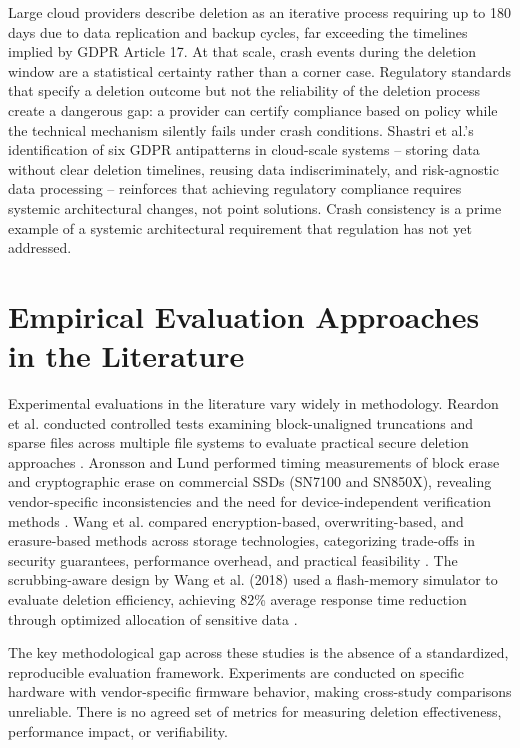 Large cloud providers describe deletion as an iterative process requiring up to 180 days due to 
data replication and backup cycles, far exceeding the timelines implied by GDPR Article 17. At 
that scale, crash events during the deletion window are a statistical certainty rather than a 
corner case. Regulatory standards that specify a deletion outcome but not the reliability of the 
deletion process create a dangerous gap: a provider can certify compliance based on policy while 
the technical mechanism silently fails under crash conditions. Shastri et al.'s identification of 
six GDPR antipatterns in cloud-scale systems -- storing data without clear deletion timelines, 
reusing data indiscriminately, and risk-agnostic data processing -- reinforces that achieving 
regulatory compliance requires systemic architectural changes, not point solutions. Crash 
consistency is a prime example of a systemic architectural requirement that regulation has not yet 
addressed.

\section{Empirical Evaluation Approaches in the Literature}
Experimental evaluations in the literature vary widely in methodology. Reardon et al. conducted 
controlled tests examining block-unaligned truncations and sparse files across multiple file 
systems to evaluate practical secure deletion approaches \cite{reardon2013sok}. Aronsson and Lund 
performed timing measurements of block erase and cryptographic erase on commercial SSDs (SN7100 
and SN850X), revealing vendor-specific inconsistencies and the need for device-independent 
verification methods \cite{aronsson2025secure}. Wang et al. compared encryption-based, 
overwriting-based, and erasure-based methods across storage technologies, categorizing trade-offs 
in security guarantees, performance overhead, and practical feasibility \cite{wang2020challenges}. 
The scrubbing-aware design by Wang et al. (2018) used a flash-memory simulator to evaluate deletion 
efficiency, achieving 82\% average response time reduction through optimized allocation of 
sensitive data \cite{3dnandwang2018}.

The key methodological gap across these studies is the absence of a standardized, reproducible 
evaluation framework. Experiments are conducted on specific hardware with vendor-specific 
firmware behavior, making cross-study comparisons unreliable. There is no agreed set of metrics 
for measuring deletion effectiveness, performance impact, or verifiability.

